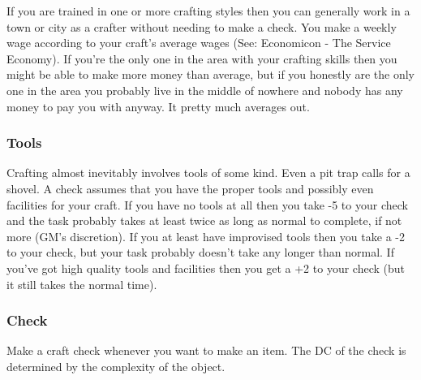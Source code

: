 If you are trained in one or more crafting styles then you can generally work in a town or city as a crafter without needing to make a check. You make a weekly wage according to your craft's average wages (See: Economicon - The Service Economy). If you're the only one in the area with your crafting skills then you might be able to make more money than average, but if you honestly are the only one in the area you probably live in the middle of nowhere and nobody has any money to pay you with anyway. It pretty much averages out.

\subsubsection{Tools}

Crafting almost inevitably involves tools of some kind. Even a pit trap calls for a shovel. A check assumes that you have the proper tools and possibly even facilities for your craft. If you have no tools at all then you take -5 to your check and the task probably takes at least twice as long as normal to complete, if not more (GM's discretion). If you at least have improvised tools then you take a -2 to your check, but your task probably doesn't take any longer than normal. If you've got high quality tools and facilities then you get a +2 to your check (but it still takes the normal time).

\subsubsection{Check}

Make a craft check whenever you want to make an item. The DC of the check is determined by the complexity of the object.

